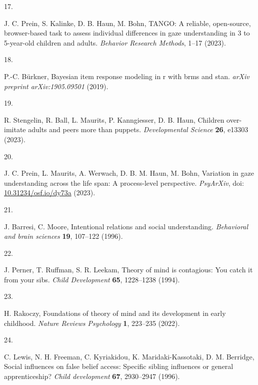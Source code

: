 \documentclass[
  man,floatsintext]{apa6}
\newlength{\cslhangindent}
\newlength{\csllabelwidth}
\newlength{\cslentryspacingunit} %
\newenvironment{CSLReferences}[2] %
 {%
  \setlength{\parindent}{0pt}
  \ifodd #1
  \let\oldpar\par
  \def\par{\hangindent=\cslhangindent\oldpar}
  \fi
  \setlength{\parskip}{#2\cslentryspacingunit}
 }%
 {}
\newcommand{\CSLLeftMargin}[1]{\parbox[t]{\csllabelwidth}{#1}}
\newcommand{\CSLRightInline}[1]{\parbox[t]{\linewidth - \csllabelwidth}{#1}\break}
\begin{document}
\begin{CSLReferences}{0}{0}
\leavevmode{}%
\CSLLeftMargin{17. }%
\CSLRightInline{J. C. Prein, S. Kalinke, D. B. Haun, M. Bohn, TANGO: A reliable, open-source, browser-based task to assess individual differences in gaze understanding in 3 to 5-year-old children and adults. \emph{Behavior Research Methods}, 1--17 (2023).}

\leavevmode{}%
\CSLLeftMargin{18. }%
\CSLRightInline{P.-C. Bürkner, Bayesian item response modeling in r with brms and stan. \emph{arXiv preprint arXiv:1905.09501} (2019).}

\leavevmode{}%
\CSLLeftMargin{19. }%
\CSLRightInline{R. Stengelin, R. Ball, L. Maurits, P. Kanngiesser, D. B. Haun, Children over-imitate adults and peers more than puppets. \emph{Developmental Science} \textbf{26}, e13303 (2023).}

\leavevmode{}%
\CSLLeftMargin{20. }%
\CSLRightInline{J. C. Prein, L. Maurits, A. Werwach, D. B. M. Haun, M. Bohn, Variation in gaze understanding across the life span: {A} process-level perspective. \emph{{PsyArXiv}}, doi: \href{https://doi.org/10.31234/osf.io/dy73a}{10.31234/osf.io/dy73a} (2023).}

\leavevmode{}%
\CSLLeftMargin{21. }%
\CSLRightInline{J. Barresi, C. Moore, Intentional relations and social understanding. \emph{Behavioral and brain sciences} \textbf{19}, 107--122 (1996).}

\leavevmode{}%
\CSLLeftMargin{22. }%
\CSLRightInline{J. Perner, T. Ruffman, S. R. Leekam, Theory of mind is contagious: You catch it from your sibs. \emph{Child Development} \textbf{65}, 1228--1238 (1994).}

\leavevmode{}%
\CSLLeftMargin{23. }%
\CSLRightInline{H. Rakoczy, Foundations of theory of mind and its development in early childhood. \emph{Nature Reviews Psychology} \textbf{1}, 223--235 (2022).}

\leavevmode{}%
\CSLLeftMargin{24. }%
\CSLRightInline{C. Lewis, N. H. Freeman, C. Kyriakidou, K. Maridaki-Kassotaki, D. M. Berridge, Social influences on false belief access: Specific sibling influences or general apprenticeship? \emph{Child development} \textbf{67}, 2930--2947 (1996).}


\end{CSLReferences}
\end{document}
